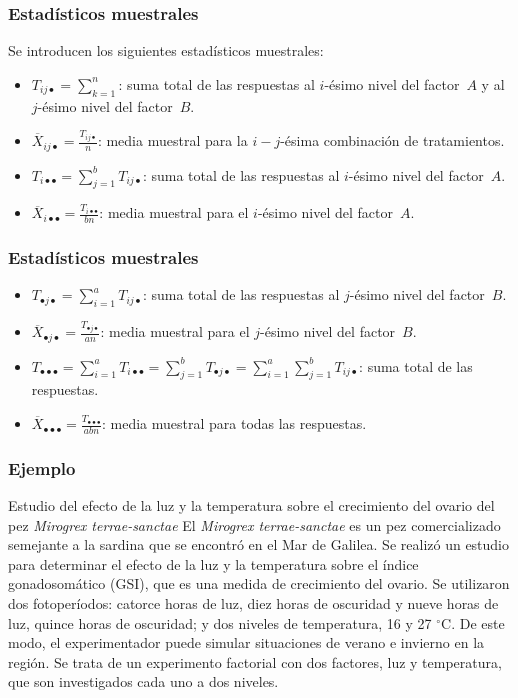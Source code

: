 \begin{frame}
\frametitle{Estadísticos muestrales}
Se introducen los siguientes estadísticos muestrales:
{
\begin{itemize}
\item<2-> $T_{ij\bullet}=\sum\limits_{k=1}^n$: suma total de las respuestas al $i$-ésimo nivel del factor~$A$ y al $j$-ésimo nivel del factor~$B$.
\item<3-> $\overline{X}_{ij\bullet}=\frac{T_{ij\bullet}}{n}$: media muestral para la $i-j$-ésima combinación de tratamientos.
\item<4-> $T_{i\bullet\bullet}=\sum\limits_{j=1}^b T_{ij\bullet}$: suma total de las respuestas al $i$-ésimo nivel del factor~$A$.
\item<5-> $\overline{X}_{i\bullet\bullet}=\frac{T_{i\bullet\bullet}}{bn}$: media muestral para el $i$-ésimo nivel del factor~$A$.
\end{itemize}}
\end{frame}
\begin{frame}
\frametitle{Estadísticos muestrales}
\begin{itemize}
\item<2-> $T_{\bullet j\bullet}=\sum\limits_{i=1}^a T_{ij\bullet}$: suma total de las respuestas al $j$-ésimo nivel del factor~$B$.
\item<3-> $\overline{X}_{\bullet j\bullet}=\frac{T_{\bullet j\bullet}}{an}$: media muestral para el $j$-ésimo nivel del factor~$B$.
\item<4-> $T_{\bullet\bullet\bullet}=\sum\limits_{i=1}^{a} T_{i\bullet\bullet}=\sum\limits_{j=1}^b T_{\bullet j\bullet} =\sum\limits_{i=1}^a\sum\limits_{j=1}^b T_{ij\bullet}$: suma total de las respuestas.
\item<5-> $\overline{X}_{\bullet\bullet\bullet}=\frac{T_{\bullet\bullet\bullet}}{a b n}$: media muestral para todas las respuestas.
\end{itemize}
\end{frame}
\begin{frame}
\frametitle{Ejemplo}
\begin{block}{Estudio del efecto de la luz y la temperatura sobre el crecimiento del ovario del pez {\it Mirogrex terrae-sanctae}}
El {\it Mirogrex terrae-sanctae} es un pez comercializado semejante a la sardina que se encontró en el Mar de Galilea. Se realizó un estudio para determinar el efecto de la luz y la temperatura sobre el índice gonadosomático (GSI), que es una medida de crecimiento del ovario. Se utilizaron dos fotoperíodos: catorce horas de luz, diez horas de oscuridad y nueve horas de luz, quince horas de oscuridad; y dos niveles de temperatura, 16 y 27 ${}^\circ$C. De este modo, el experimentador puede simular situaciones de verano e invierno en la región. Se trata de un experimento factorial con dos factores, luz y temperatura, que son investigados cada uno a dos niveles.
\end{block}
\end{frame}
